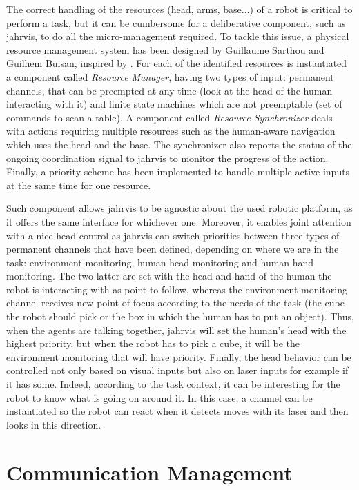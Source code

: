 \documentclass[a4paper,11pt,twoside]{StyleThese}
\begin{document}
The correct handling of the resources (head, arms, base...) of a robot is critical to perform a task, but it can be cumbersome for a deliberative component, such as \acrshort{jahrvis}, to do all the micro-management required. To tackle this issue, a physical resource management system has been designed by Guillaume Sarthou and Guilhem Buisan, inspired by \cite{devin_2017_decisional}. For each of the identified resources is instantiated a component called \emph{Resource Manager}, having two types of input: permanent channels, that can be preempted at any time (\eg look at the head of the human interacting with it) and finite state machines which are not preemptable (\eg set of commands to scan a table). A component called \emph{Resource Synchronizer} deals with actions requiring multiple resources such as the human-aware navigation which uses the head and the base. The synchronizer also reports the status of the ongoing coordination signal to \acrshort{jahrvis} to monitor the progress of the action. Finally, a priority scheme has been implemented to handle multiple active inputs at the same time for one resource. 

Such component allows \acrshort{jahrvis} to be agnostic about the used robotic platform, as it offers the same interface for whichever one. Moreover, it enables joint attention with a nice head control as \acrshort{jahrvis} can switch priorities between three types of permanent channels that have been defined, depending on where we are in the task: environment monitoring, human head monitoring and human hand monitoring. The two latter are set with the head and hand of the human the robot is interacting with as point to follow, whereas the environment monitoring channel receives new point of focus according to the needs of the task (\eg the cube the robot should pick or the box in which the human has to put an object). Thus, when the agents are talking together, \acrshort{jahrvis} will set the human's head with the highest priority, but when the robot has to pick a cube, it will be the environment monitoring that will have priority. Finally, the head behavior can be controlled not only based on visual inputs but also on laser inputs for example if it has some. Indeed, according to the task context, it can be interesting for the robot to know what is going on around it. In this case, a channel can be instantiated so the robot can react when it detects moves with its laser and then looks in this direction.

\section{Communication Management}\label{chap6:sec:comm}
\end{document}
